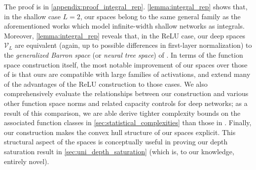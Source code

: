 \documentclass{article}
\def\cV{{\mathcal{V}}}
\begin{document}
The proof is in \cref{appendix:proof_integral_rep}. \cref{lemma:integral_rep} shows that, in the shallow case $L = 2$, our spaces belong to the same general family as the aforementioned works which model infinite-width shallow networks as integrals. Moreover, \cref{lemma:integral_rep} reveals that, in the ReLU case, our deep spaces $\cV_L$ are equivalent (again, up to possible differences in first-layer normalization) to the \textit{generalized Barron space} (or \textit{neural tree space}) of \cite{wojtowytsch2020banach}. In terms of the function space construction itself, the most notable improvement of our spaces over those of \cite{wojtowytsch2020banach} is that ours are compatible with large families of activations, and extend many of the advantages of the ReLU construction to those cases. We also comprehensively evaluate the relationships between our construction and various other function space norms and related capacity controls for deep networks; as a result of this comparison, we are able derive tighter complexity bounds on the associated function classes in \cref{sec:statistical_complexities} than those in \cite{wojtowytsch2020banach}. Finally, our construction makes the convex hull structure of our spaces explicit. This structural aspect of the spaces is conceptually useful in proving our depth saturation result in \cref{sec:uni_depth_saturation} (which is, to our knowledge, entirely novel).
\end{document}
